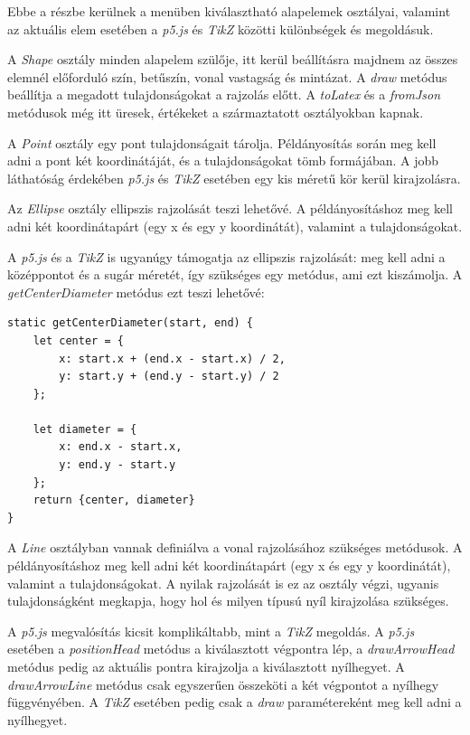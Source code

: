 
Ebbe a részbe kerülnek a menüben kiválasztható alapelemek osztályai, valamint az aktuális elem esetében a  \textit{p5.js} és \textit{TikZ} közötti különbségek és megoldásuk. 


A \textit{Shape} osztály minden alapelem szülője, itt kerül beállításra majdnem az összes elemnél előforduló szín, betűszín, vonal vastagság és mintázat. A \textit{draw} metódus beállítja a megadott tulajdonságokat a rajzolás előtt. A \textit{toLatex} és a \textit{fromJson} metódusok még itt üresek, értékeket a származtatott osztályokban kapnak.


A \textit{Point} osztály egy pont tulajdonságait tárolja. Példányosítás során meg kell adni a pont két koordinátáját, és a tulajdonságokat tömb formájában. A jobb láthatóság érdekében \textit{p5.js} és \textit{TikZ} esetében egy kis méretű kör kerül kirajzolásra. 


Az \textit{Ellipse} osztály ellipszis rajzolását teszi lehetővé. A példányosításhoz meg kell adni két koordinátapárt (egy x és egy y koordinátát), valamint a tulajdonságokat. 

A \textit{p5.js} és a \textit{TikZ} is ugyanúgy támogatja az ellipszis rajzolását: meg kell adni a középpontot és a sugár méretét, így szükséges egy metódus, ami ezt kiszámolja. A \textit{getCenterDiameter} metódus ezt teszi lehetővé:

\begin{lstlisting}[style=es6]
static getCenterDiameter(start, end) {
	let center = {
		x: start.x + (end.x - start.x) / 2,
		y: start.y + (end.y - start.y) / 2
	};

	let diameter = {
		x: end.x - start.x,
		y: end.y - start.y
	};
	return {center, diameter}
}
\end{lstlisting}


A \textit{Line} osztályban vannak definiálva a vonal rajzolásához szükséges metódusok. A példányosításhoz meg kell adni két koordinátapárt (egy x és egy y koordinátát), valamint a tulajdonságokat. A nyilak rajzolását is ez az osztály végzi, ugyanis tulajdonságként megkapja, hogy hol és milyen típusú nyíl kirajzolása szükséges. 

A \textit{p5.js} megvalósítás kicsit komplikáltabb, mint a \textit{TikZ} megoldás. A \textit{p5.js} esetében a \textit{positionHead} metódus a kiválasztott végpontra lép, a \textit{drawArrowHead} metódus pedig az aktuális pontra kirajzolja a kiválasztott nyílhegyet. A \textit{drawArrowLine} metódus csak egyszerűen összeköti a két végpontot a nyílhegy függvényében. A \textit{TikZ} esetében pedig csak a \textit{draw} paramétereként meg kell adni a nyílhegyet.

